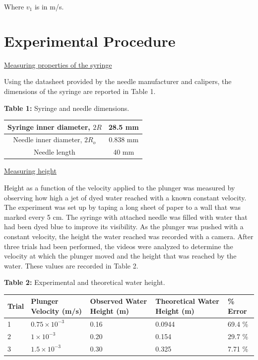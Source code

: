 \documentclass{article}
\begin{document}
Where $v_{1}$ is in m/s.
\\

\section{Experimental Procedure}

\underline{Measuring properties of the syringe}

Using the datasheet provided by the needle manufacturer and calipers, the dimensions of the syringe are reported in Table 1.

\begin{center}\textbf{Table 1:} Syringe and needle dimensions. \end{center}
\begin{center}
\begin{tabular}{| c | c |}
\hline
Syringe inner diameter, $2R$ & 28.5 mm \\ 
\hline
Needle inner diameter, $2R_{o}$ & 0.838 mm \\  
\hline
Needle length & 40 mm \\  
\hline
\end{tabular}
\end{center}

\noindent\underline{Measuring height}

Height as a function of the velocity applied to the plunger was measured by observing how high a jet of dyed water reached with a known constant velocity.
The experiment was set up by taping a long sheet of paper to a wall that was marked every 5 cm.
The syringe with attached needle was filled with water that had been dyed blue to improve its visibility.
As the plunger was pushed with a constant velocity, the height the water reached was recorded with a camera.
After three trials had been performed, the videos were analyzed to determine the velocity at which the plunger moved and the height that was reached by the water.
These values are recorded in Table 2.

\begin{center}\textbf{Table 2:} Experimental and theoretical water height. \end{center}
\begin{center}
\begin{tabular}{| p{1cm} | p{3.6cm} | p{3.6cm} | p{3.6cm} | p{2cm} |}
\hline
\textbf{Trial} & \textbf{Plunger Velocity (m/s)} & \textbf{Observed Water Height (m)} & \textbf{Theoretical Water Height (m)} & \textbf{\% Error} \\
\hline
1 & $0.75 \times 10^{-3}$ & 0.16 & 0.0944 & 69.4 \% \\  
\hline
2 & $1 \times 10^{-3}$ & 0.20 & 0.154 & 29.7 \% \\
\hline
3 & $1.5 \times 10^{-3}$ & 0.30 & 0.325 & 7.71 \% \\  
\hline
\end{tabular}
\end{center}
\end{document}
